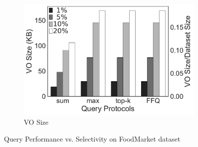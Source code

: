 \begin{figure}[t]
\begin{subfigure}[b]{.37\linewidth}
    \includegraphics[width=\linewidth]{exp-figs/aggregate-queries/foodmarket_vo.pdf}
    \caption{VO Size}
  \end{subfigure}
  \caption{Query Performance vs. Selectivity on FoodMarket dataset}\label{fig:aggregate-queries:foodmarket}


\end{figure}
